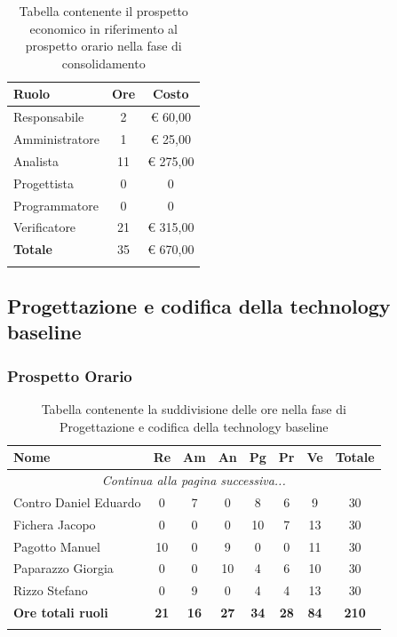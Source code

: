 \documentclass[../piano_di_progetto.tex]{subfiles}
\begin{document}
\begin{longtable}{|l|c|c|}
	\hline
	\rowcolor{lightgray}
	\textbf{Ruolo} & \textbf{Ore} & \textbf{Costo}\\
	\endhead
	\hline
	Responsabile & 2 & € 60,00 \\
	Amministratore & 1 & € 25,00 \\
	Analista & 11 & € 275,00 \\
	Progettista & 0 & 0 \\
	Programmatore & 0 & 0 \\
	Verificatore & 21 & € 315,00 \\
	\hline
	\textbf{Totale} & 35 & € 670,00 \\
	\hline
	\rowcolor{white}
	\caption{Tabella contenente il prospetto economico in riferimento al prospetto orario nella fase di consolidamento} 
\end{longtable}

\subsection{Progettazione e codifica della technology baseline}%
\label{sub:fase_prog_arc}
\subsubsection{Prospetto Orario}

\begin{center}
	\begin{longtable}{|l|c|c|c|c|c|c|c|}
		\hline
		\rowcolor{lightgray}
		\textbf{Nome} & \textbf{Re} & \textbf{Am} & \textbf{An} & \textbf{Pg}  & \textbf{Pr}   & \textbf{Ve} & \textbf{Totale} \\
		\hline
		\endhead
		
		\hline
		\multicolumn{8}{|c|}{\emph{Continua alla pagina successiva...}}\\
		\hline
		\endfoot

		\endlastfoot
		
		\hline
			Contro Daniel Eduardo & 0 & 7 & 0 & 8 & 6 & 9 & 30\\
			Fichera Jacopo & 0 & 0 & 0 & 10 & 7 & 13 & 30 \\
			Pagotto Manuel & 10 & 0 & 9 & 0 & 0 & 11 & 30 \\			
			Paparazzo Giorgia & 0 & 0 & 10 & 4 & 6 & 10 & 30 \\
			Rizzo Stefano & 0 & 9 & 0 & 4 & 4 & 13 & 30\\
			\hline
		\textbf{Ore totali ruoli} & \textbf{21} & \textbf{16} & \textbf{27} & \textbf{34} & \textbf{28} & \textbf{84} & \textbf{210} \\
		\hline	
		\rowcolor{white}
		\caption{Tabella contenente la suddivisione delle ore nella fase di Progettazione e codifica della technology baseline}
	\end{longtable}
\end{center}
\end{document}
